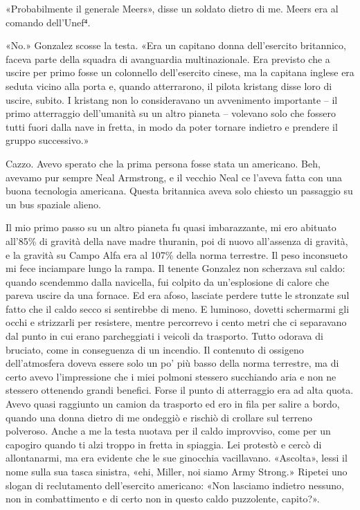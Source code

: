 «Probabilmente il generale Meers», disse un soldato dietro di me. Meers
era al comando dell'Unef⁴.

«No.» Gonzalez scosse la testa. «Era un capitano donna dell'esercito
britannico, faceva parte della squadra di avanguardia multinazionale.
Era previsto che a uscire per primo fosse un colonnello dell'esercito
cinese, ma la capitana inglese era seduta vicino alla porta e, quando
atterrarono, il pilota kristang disse loro di uscire, subito. I kristang
non lo consideravano un avvenimento importante -- il primo atterraggio
dell'umanità su un altro pianeta -- volevano solo che fossero tutti
fuori dalla nave in fretta, in modo da poter tornare indietro e prendere
il gruppo successivo.»

Cazzo. Avevo sperato che la prima persona fosse stata un americano. Beh,
avevamo pur sempre Neal Armstrong, e il vecchio Neal ce l'aveva fatta
con una buona tecnologia americana. Questa britannica aveva solo chiesto
un passaggio su un bus spaziale alieno.

Il mio primo passo su un altro pianeta fu quasi imbarazzante, mi ero
abituato all'85\% di gravità della nave madre thuranin, poi di nuovo
all'assenza di gravità, e la gravità su Campo Alfa era al 107\% della
norma terrestre. Il peso inconsueto mi fece inciampare lungo la rampa.
Il tenente Gonzalez non scherzava sul caldo: quando scendemmo dalla
navicella, fui colpito da un'esplosione di calore che pareva uscire da
una fornace. Ed era afoso, lasciate perdere tutte le stronzate sul fatto
che il caldo secco si sentirebbe di meno. E luminoso, dovetti schermarmi
gli occhi e strizzarli per resistere, mentre percorrevo i cento metri
che ci separavano dal punto in cui erano parcheggiati i veicoli da
trasporto. Tutto odorava di bruciato, come in conseguenza di un
incendio. Il contenuto di ossigeno dell'atmosfera doveva essere solo un
po' più basso della norma terrestre, ma di certo avevo l'impressione che
i miei polmoni stessero succhiando aria e non ne stessero ottenendo
grandi benefici. Forse il punto di atterraggio era ad alta quota. Avevo
quasi raggiunto un camion da trasporto ed ero in fila per salire a
bordo, quando una donna dietro di me ondeggiò e rischiò di crollare sul
terreno polveroso. Anche a me la testa nuotava per il caldo improvviso,
come per un capogiro quando ti alzi troppo in fretta in spiaggia. Lei
protestò e cercò di allontanarmi, ma era evidente che le sue ginocchia
vacillavano. «Ascolta», lessi il nome sulla sua tasca sinistra, «ehi,
Miller, noi siamo Army Strong.» Ripetei uno slogan di reclutamento
dell'esercito americano: «Non lasciamo indietro nessuno, non in
combattimento e di certo non in questo caldo puzzolente, capito?».

